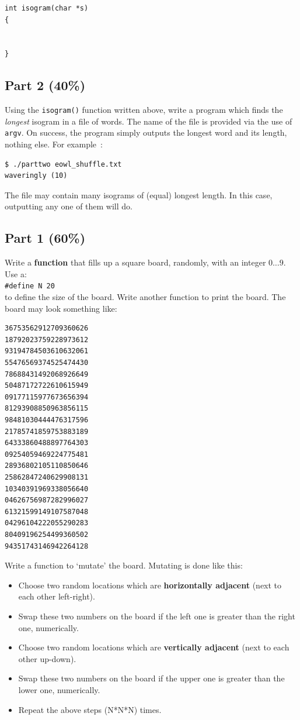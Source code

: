 \begin{appendices}
\begin{verbatim}
int isogram(char *s)
{


}
\end{verbatim} 

\subsection*{Part 2 (40\%)}
Using the \verb^isogram()^ function written above, write a program which finds the {\it longest} isogram in a
file of words. The name of the file is provided via the use of \verb^argv^.
On success, the program simply outputs the longest word and its length, nothing else. For
example~:
\begin{verbatim}
$ ./parttwo eowl_shuffle.txt
waveringly (10)
\end{verbatim}

The file may contain many isograms of (equal) longest length. In this case,
outputting any one of them will do. 

\subsection*{Part 1 (60\%)}

Write a {\bf function} that fills up a square board, randomly,
with an integer $0 \dots 9$. Use a:\\
\verb^#define N 20^\\
to define the size of the board.  Write another function to print the board.
The board may look something like:

{\small
\begin{verbatim}
36753562912709360626
18792023759228973612
93194784503610632061
55476569374525474430
78688431492068926649
50487172722610615949
09177115977673656394
81293908850963856115
98481030444476317596
21785741859753883189
64333860488897764303
09254059469224775481
28936802105110850646
25862847240629908131
10340391969338056640
04626756987282996027
61321599149107587048
04296104222055290283
80409196254499360502
94351743146942264128
\end{verbatim}
}

Write a
function to `mutate' the board. Mutating is done like this:
\begin{itemize}
\item Choose two random locations which are {\bf horizontally adjacent} (next to each other left-right).
\item Swap these two numbers on the board if the left one is greater than the right one, numerically.
\item Choose two random locations which are {\bf vertically adjacent} (next to each other up-down).
\item Swap these two numbers on the board if the upper one is greater than the lower one, numerically.
\item Repeat the above steps (N*N*N) times.
\end{itemize}


\end{appendices}
